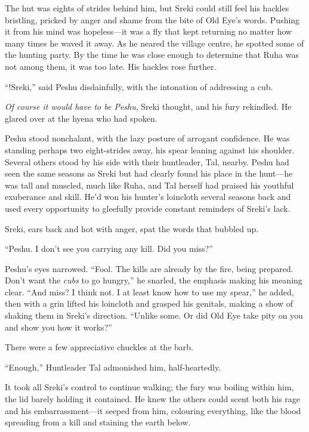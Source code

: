 \secdiv

\noindent The hut was eights of strides behind him, but Sreki could still feel his hackles bristling, pricked by anger and shame from the bite of Old Eye's words. Pushing it from his mind was hopeless---it was a fly that kept returning no matter how many times he waved it away. As he neared the village centre, he spotted some of the hunting party. By the time he was close enough to determine that Ruha was not among them, it was too late. His hackles rose further.

``!Sreki,'' said Peshu disdainfully, with the intonation of addressing a cub.

\emph{Of course it would have to be Peshu}, Sreki thought, and his fury rekindled. He glared over at the hyena who had spoken.

Peshu stood nonchalant, with the lazy posture of arrogant confidence. He was standing perhaps two eight-strides away, his spear leaning against his shoulder. Several others stood by his side with their huntleader, Tal, nearby. Peshu had seen the same seasons as Sreki but had clearly found his place in the hunt---he was tall and muscled, much like Ruha, and Tal herself had praised his youthful exuberance and skill. He'd won his hunter's loincloth several seasons back and used every opportunity to gleefully provide constant reminders of Sreki's lack.

Sreki, ears back and hot with anger, spat the words that bubbled up.

``Peshu. I don't see you carrying any kill. Did you miss?''

Peshu's eyes narrowed. ``Fool. The kills are already by the fire, being prepared. Don't want the \emph{cubs} to go hungry,'' he snarled, the emphasis making his meaning clear. ``And miss? I think not. I at least know how to use my spear,'' he added, then with a grin lifted his loincloth and grasped his genitals, making a show of shaking them in Sreki's direction. ``Unlike some. Or did Old Eye take pity on you and show you how it works?''

There were a few appreciative chuckles at the barb.

``Enough,'' Huntleader Tal admonished him, half-heartedly.

It took all Sreki's control to continue walking; the fury was boiling within him, the lid barely holding it contained. He knew the others could scent both his rage and his embarrassment---it seeped from him, colouring everything, like the blood spreading from a kill and staining the earth below.

